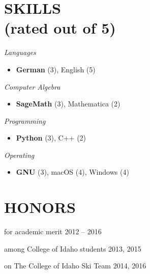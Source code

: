 \documentclass[margin]{res}
\newcommand\cs[1]{\textsl{#1} } \newcommand\ri[1]{\textsl{#1} }
\newenvironment{details}{\begin{itemize}[itemsep=0.6pt,topsep=2.2pt] }{\end{itemize} }
\begin{document}
\begin{resume}
\section{SKILLS\\(rated out of 5)}
\vspace{0pt}
\begin{multicols}{2}
    \parskip=0pt
    \cs{Languages}
            \begin{details}
                \item \textbf{German} (3), English (5)
            \end{details}
    \cs{Computer Algebra} 
            \begin{details}
                \item \textbf{SageMath} (3), Mathematica (2)
            \end{details}
    \cs{Programming}
            \begin{details}
                \item \textbf{Python} (3), C++ (2)
            \end{details}
    \cs{Operating}
            \begin{details}
                \item \textbf{GNU} (3), macOS (4), Windows (4)
            \end{details}    
\end{multicols}

\section{HONORS}
\vspace{10pt}
    \begin{description}[noitemsep,topsep=0pt]
        \item[Heritage Scholarship] for academic merit \hfill 2012 -- 2016
        \item[Top Putnam Score] among College of Idaho students \hfill 2013, 2015
        \item[Varsity Skier] on The College of Idaho Ski Team \hfill 2014, 2016
    \end{description}

\end{resume}
\end{document}
